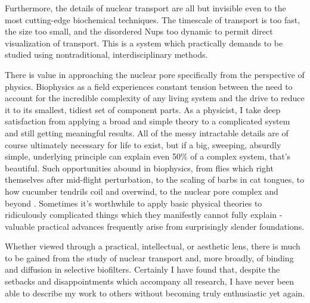 Furthermore, the details of nuclear transport are all but invisible even to the most cutting-edge biochemical techniques.  The timescale of transport is too fast, the size too small, and the disordered Nups too dynamic to permit direct visualization of transport.  This is a system which practically demands to be studied using nontraditional, interdisciplinary methods. 

 There is value in approaching the nuclear pore specifically from the perspective of physics.  Biophysics as a field experiences constant tension between the need to account for the incredible complexity of any living system and the drive to reduce it to its smallest, tidiest set of component parts.  As a physicist, I take deep satisfaction from applying a broad and simple theory to a complicated system and still getting meaningful results.  All of the messy intractable details are of course ultimately necessary for life to exist, but if a big, sweeping, absurdly simple, underlying principle can explain even 50\% of a complex system, that's beautiful.  Such opportunities abound in biophysics, from flies which right themselves after mid-flight perturbation, to the scaling of barbs in cat tongues, to how cucumber tendrils coil and overwind, to the nuclear pore complex and beyond \cite{ristroph12,noel18,gerbode12}.  Sometimes it's worthwhile to apply basic physical theories to ridiculously complicated things which they manifestly cannot fully explain - valuable practical advances frequently arise from surprisingly slender foundations.

Whether viewed through a practical, intellectual, or aesthetic lens, there is much to be gained from the study of nuclear transport and, more broadly, of binding and diffusion in selective biofilters.  Certainly I have found that, despite the setbacks and disappointments which accompany all research, I have never been able to describe my work to others without becoming truly enthusiastic yet again.



